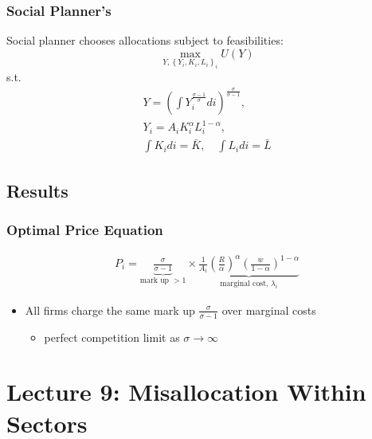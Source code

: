 \documentclass[10pt]{article}
\begin{document}
\subsubsection{Social Planner's}

Social planner chooses allocations subject to feasibilities:
$$
\max _{Y,\left\{Y_i, K_i, L_i\right\}_i} U(Y)
$$
s.t.
$$
\begin{gathered}
Y=\left(\int Y_i^{\frac{\sigma-1}{\sigma}} d i\right)^{\frac{\sigma}{\sigma-1}}, \\
Y_i=A_i K_i^\alpha L_i^{1-\alpha}, \\
\int K_i d i=\bar{K}, \quad \int L_i d i=\bar{L}
\end{gathered}
$$


\subsection{Results}

\subsubsection{Optimal Price Equation}

\begin{align}
    P_i=\underbrace{\frac{\sigma}{\sigma-1}}_{\text {mark up }>1} \times \underbrace{\frac{1}{A_i}\left(\frac{R}{\alpha}\right)^\alpha\left(\frac{w}{1-\alpha}\right)^{1-\alpha}}_{\text {marginal cost, } \lambda_i}
\end{align}

\begin{itemize}
    \item All firms charge the same mark up $\frac{\sigma}{\sigma-1}$ over marginal costs
        \begin{itemize}
            \item perfect competition limit as $\sigma \rightarrow \infty$
        \end{itemize}
\end{itemize}


\section{Lecture 9: Misallocation Within Sectors}
\end{document}
